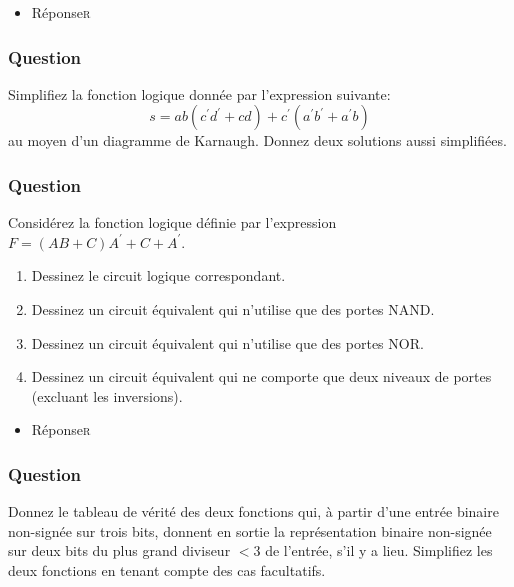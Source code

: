 \documentclass[11pt]{article}
\begin{document}
\begin{itemize}
\item Réponse\hfill{}\textsc{r}
\label{sec:orgef346fe}
\end{itemize}

\subsubsection*{Question}
\label{sec:orga2f6816}
Simplifiez la fonction logique donnée par l'expression suivante:
  $$
    s = a b ( c^{\prime} d^{\prime} + c d) + c^{\prime}(a^{\prime}
      b^{\prime} + a^{\prime} b)
    $$
   au moyen d'un diagramme de Karnaugh. Donnez deux solutions aussi simplifiées.

\subsubsection*{Question}
\label{sec:org30c2bdf}
Considérez la fonction logique définie par l'expression \(F = (AB + C)
      A^{\prime} + C + A^{\prime}\).

\begin{enumerate}
\item Dessinez le circuit logique correspondant.

\item Dessinez un circuit équivalent qui n'utilise que des portes
NAND.

\item Dessinez un circuit équivalent qui n'utilise que des portes
NOR.

\item Dessinez un circuit équivalent qui ne comporte que deux niveaux de
portes (excluant les inversions).
\end{enumerate}

\begin{itemize}
\item Réponse\hfill{}\textsc{r}
\label{sec:org1e49e4d}
\end{itemize}

\subsubsection*{Question}
\label{sec:org1db66df}
Donnez le tableau  de vérité des deux fonctions qui, à partir d'une
  entrée binaire non-signée sur trois bits, donnent en sortie la
  représentation binaire non-signée sur deux bits du plus grand diviseur
  \(< 3\) de l'entrée, s'il y a lieu. Simplifiez les deux fonctions en
  tenant compte des cas facultatifs.
\end{document}
